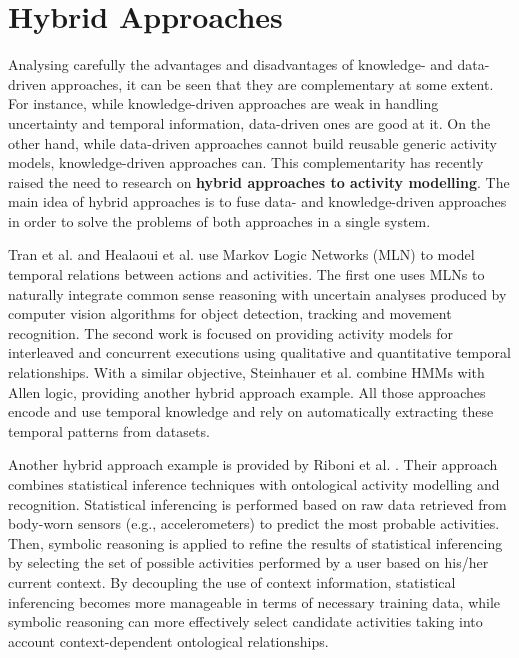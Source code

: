 \section{Hybrid Approaches}
\label{sec:soa:hybrid}


Analysing carefully the advantages and disadvantages of knowledge- and data-driven approaches, it can be seen that they are complementary at some extent. For instance, while knowledge-driven approaches are weak in handling uncertainty and temporal information, data-driven ones are good at it. On the other hand, while data-driven approaches cannot build reusable generic activity models, knowledge-driven approaches can. This complementarity has recently raised the need to research on \textbf{hybrid approaches to activity modelling}. The main idea of hybrid approaches is to fuse data- and knowledge-driven approaches in order to solve the problems of both approaches in a single system.

Tran et al. \cite{Tran2008} and Healaoui et al. \cite{Helaoui2011a} use Markov Logic Networks (MLN) to model temporal relations between actions and activities. The first one uses MLNs to naturally integrate common sense reasoning with uncertain analyses produced by computer vision algorithms for object detection, tracking and movement recognition. The second work is focused on providing activity models for interleaved and concurrent executions using qualitative and quantitative temporal relationships. With a similar objective, Steinhauer et al. \cite{Steinhauer2010} combine HMMs with Allen logic, providing another hybrid approach example. All those approaches encode and use temporal knowledge and rely on automatically extracting these temporal patterns from datasets.

Another hybrid approach example is provided by Riboni et al. \cite{Riboni2011a}. Their approach combines statistical inference techniques with ontological activity modelling and recognition. Statistical inferencing is performed based on raw data retrieved from body-worn sensors (e.g., accelerometers) to predict the most probable activities. Then, symbolic reasoning is applied to refine the results of statistical inferencing by selecting the set of possible activities performed by a user based on his/her current context. By decoupling the use of context information, statistical inferencing becomes more manageable in terms of necessary training data, while symbolic reasoning can more effectively select candidate activities taking into account context-dependent ontological relationships.

